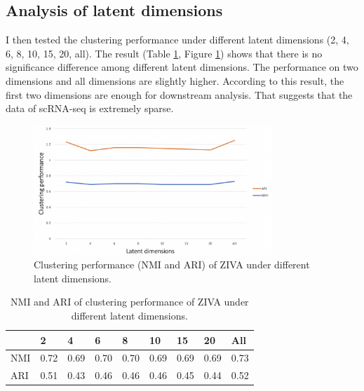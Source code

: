 \clearpage

\subsection{Analysis of latent dimensions}
I then tested the clustering performance under different latent dimensions (2, 4, 6, 8, 10, 15, 20, all). The result (Table \ref{dimt}, Figure \ref{dim}) shows that there is no significance difference among different latent dimensions. The performance on two dimensions and all dimensions are slightly higher. According to this result, the first two dimensions are enough for downstream analysis. That suggests that the data of scRNA-seq is extremely sparse.
\begin{figure}[htb!]
    \centering
    \includegraphics[width=0.8\textwidth]{figures/myfigures/dim.png}
    \caption{Clustering performance (NMI and ARI) of ZIVA under different latent dimensions.}
    \label{dim}
\end{figure}

\begin{table}[htb!]
\centering
\caption{NMI and ARI of clustering performance of ZIVA under different latent dimensions.}
\label{dimt}
\begin{tabular}{lllllllll}
\hline
    & 2    & 4    & 6    & 8    & 10   & 15   & 20   & All  \\ \hline
NMI & 0.72 & 0.69 & 0.70 & 0.70 & 0.69 & 0.69 & 0.69 & 0.73 \\
ARI & 0.51 & 0.43 & 0.46 & 0.46 & 0.46 & 0.45 & 0.44 & 0.52 \\ \hline
\end{tabular}
\end{table}